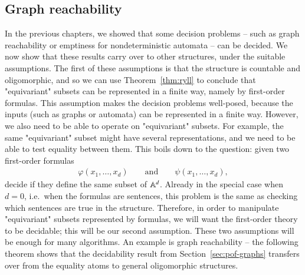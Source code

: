 \subsection*{Graph reachability}
\label{sec:oligo-graph-reachability}
In the previous chapters, we showed that some decision problems -- such as graph reachability or emptiness for nondeterministic automata -- can be decided. We now show that these results carry over to other structures, under the suitable assumptions. The first of these assumptions is that the structure is countable and oligomorphic, and so we can use Theorem~\ref{thm:ryll} to conclude that "equivariant" subsets can be represented in a finite way, namely by first-order formulas. This assumption makes the decision problems well-posed, because the inputs (such as graphs or automata) can be represented in a finite way. However, we also need to be able to operate on "equivariant" subsets. For example, the same "equivariant" subset might have several representations, and we need to be able to test equality between them. This boils down to the question: given two first-order formulas 
\begin{align*}
\varphi(x_1,\ldots,x_d) \qquad \text{and} \qquad \psi(x_1,\ldots,x_d),
\end{align*}
decide if they define the same subset of $\mathbb A^d$. Already in the special case when $d=0$, i.e.~when the formulas are sentences, this problem is the same as checking which sentences are true in the structure. Therefore, in order to manipulate "equivariant" subsets represented by formulas, we will want the first-order theory to be decidable; this will be our second assumption. These two assumptions will be enough for many algorithms. An example is graph reachability -- the following theorem shows that the decidability result from Section~\ref{sec:pof-graphs} transfers over from the equality atoms to general oligomorphic structures.

